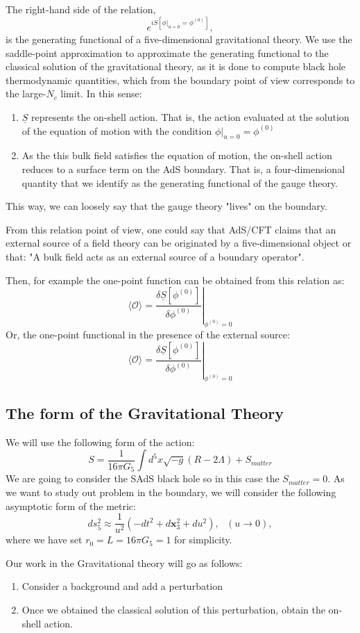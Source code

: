 \documentclass[12pt]{article}
\begin{document}
The right-hand side of the relation,
\[
    e^{iS[\left.\phi\right|_{u=0}=\phi^{(0)}]},
\]
is the generating functional of a five-dimensional gravitational theory. We use the saddle-point approximation to approximate the generating functional to the classical solution of the gravitational theory, as it is done to compute black hole thermodynamic quantities, which from the boundary point of view corresponds to the large-$N_c$ limit. In this sense:
\begin{enumerate}
    \item $\underline{S}$ represents the on-shell action. That is, the action evaluated at the solution of the equation of motion with the condition $\left.\phi\right|_{u=0}=\phi^{(0)}$
    \item As the this bulk field satisfies the equation of motion, the on-shell action reduces to a surface term on the AdS boundary. That is, a four-dimensional quantity that we identify as the generating functional of the gauge theory.
\end{enumerate}

This way, we can loosely say that the gauge theory "lives" on the boundary.

\vspace{.25cm}

From this relation point of view, one could say that AdS/CFT claims that an external source of a field theory can be originated by a five-dimensional object or that: "A bulk field acts as an external source of a boundary operator".

Then, for example the one-point function can be obtained from this relation as:
\[
    \langle\mathcal{O}\rangle = \left.\frac{\delta \underline{S}[\phi^{(0)}]}{\delta\phi^{(0)}}\right|_{\phi^{(0)}=0}
\]
Or, the one-point functional in the presence of the external source:
\[
    \langle\mathcal{O}\rangle = \left.\frac{\delta \underline{S}[\phi^{(0)}]}{\delta\phi^{(0)}}\right|_{\phi^{(0)}=0}
\]

\subsection{The form of the Gravitational Theory}

We will use the following form of the action:
\[
    S = \frac{1}{16\pi G_5}\int d^5 x \sqrt{-g}(R-2\Lambda) + S_{matter}
\]
We are going to consider the SAdS black hole so in this case the $S_{matter}=0$. As we want to study out problem in the boundary, we will consider the following asymptotic form of the metric:
\[
    ds_5^2\approx \frac{1}{u^2}(-dt^2 + d\mathbf{x}_3^2 + du^2), ~~~ (u\rightarrow 0),
\]
where we have set $r_0=L=16\pi G_5 = 1$ for simplicity. 

\vspace{0.25cm}

Our work in the Gravitational theory will go as follows:
\begin{enumerate}
    \item Consider a background and add a perturbation
    \item Once we obtained the classical solution of this perturbation, obtain the on-shell action.
\end{enumerate}
\end{document}
